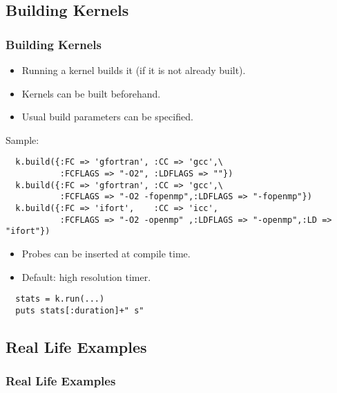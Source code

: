 \documentclass{beamer}
\begin{document}
\subsection{Building Kernels}
\begin{frame}[fragile]
\frametitle{Building Kernels}
\begin{itemize}
\item Running a kernel builds it (if it is not already built).
\item Kernels can be built beforehand.
\item Usual build parameters can be specified.
\end{itemize}
Sample:
\lstset{style=BOAST}
\tiny
\begin{lstlisting}
  k.build({:FC => 'gfortran', :CC => 'gcc',\
           :FCFLAGS => "-O2", :LDFLAGS => ""})
  k.build({:FC => 'gfortran', :CC => 'gcc',\
           :FCFLAGS => "-O2 -fopenmp",:LDFLAGS => "-fopenmp"})
  k.build({:FC => 'ifort',    :CC => 'icc',
           :FCFLAGS => "-O2 -openmp" ,:LDFLAGS => "-openmp",:LD => "ifort"})
\end{lstlisting}
\normalsize
\begin{itemize}
\item Probes can be inserted at compile time.
\item Default: high resolution timer.
\end{itemize}
\lstset{style=BOAST}
\tiny
\begin{lstlisting}
  stats = k.run(...)
  puts stats[:duration]+" s"
\end{lstlisting}
\end{frame}

\subsection{Real Life Examples}
\begin{frame}
\frametitle {Real Life Examples}
\end{frame}
\end{document}
